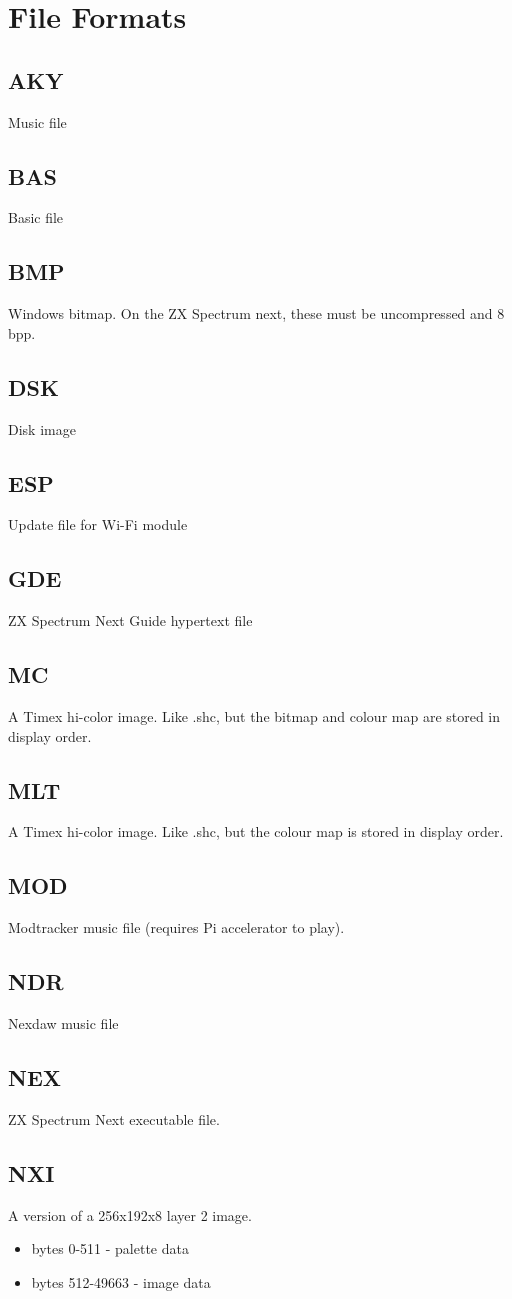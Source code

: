 \chapter{File Formats}
\section{AKY}
Music file
\section{BAS}
Basic file
\section{BMP}
Windows bitmap. On the ZX Spectrum next, these must be uncompressed
and 8 bpp.
\section{DSK}
Disk image
\section{ESP}
Update file for Wi-Fi module
\section{GDE}
ZX Spectrum Next Guide hypertext file
\section{MC}
A Timex hi-color image. Like .shc, but the bitmap and colour map are
stored in display order.
\section{MLT}
A Timex hi-color image. Like .shc, but the colour map is stored in
display order.
\section{MOD}
Modtracker music file (requires Pi accelerator to play).
\section{NDR}
Nexdaw music file
\section{NEX}
ZX Spectrum Next executable file.
\section{NXI}
A version of a 256x192x8 layer 2 image.
\begin{itemize}
\item bytes 0-511 - palette data
\item bytes 512-49663 - image data
\end{itemize}
